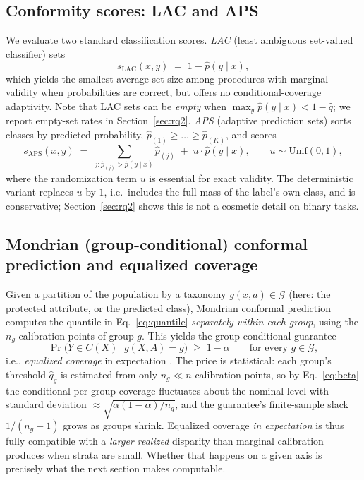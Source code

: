 \documentclass[review,12pt]{elsarticle}
\begin{document}
\subsection{Conformity scores: LAC and APS}
We evaluate two standard classification scores.
\emph{LAC} (least ambiguous set-valued classifier) \cite{sadinle2019} sets
\begin{equation}
s_{\mathrm{LAC}}(x,y) \;=\; 1 - \hat p(y \mid x),
\end{equation}
which yields the smallest average set size among procedures with marginal validity when probabilities are correct, but offers no conditional-coverage adaptivity. Note that LAC sets can be \emph{empty} when $\max_y \hat p(y\mid x) < 1-\hat q$; we report empty-set rates in Section~\ref{sec:rq2}.
\emph{APS} (adaptive prediction sets) \cite{romano2020aps} sorts classes by predicted probability, $\hat p_{(1)} \ge \dots \ge \hat p_{(K)}$, and scores
\begin{equation}
s_{\mathrm{APS}}(x,y) \;=\; \sum_{j : \hat p_{(j)} > \hat p(y\mid x)} \hat p_{(j)} \;+\; u \cdot \hat p(y \mid x),
\qquad u \sim \mathrm{Unif}(0,1),
\label{eq:aps}
\end{equation}
where the randomization term $u$ is essential for exact validity. The deterministic variant replaces $u$ by $1$, i.e.\ includes the full mass of the label's own class, and is conservative; Section~\ref{sec:rq2} shows this is not a cosmetic detail on binary tasks.

\subsection{Mondrian (group-conditional) conformal prediction and equalized coverage}
Given a partition of the population by a taxonomy $g(x,a) \in \mathcal{G}$ (here: the protected attribute, or the predicted class), Mondrian conformal prediction \cite{vovk2003,vovk2012} computes the quantile in Eq.~\eqref{eq:quantile} \emph{separately within each group}, using the $n_g$ calibration points of group $g$. This yields the group-conditional guarantee
\begin{equation}
\Pr\big(Y \in C(X) \,\big|\, g(X,A) = g\big) \;\ge\; 1-\alpha \qquad \text{for every } g \in \mathcal{G},
\label{eq:mondrian}
\end{equation}
i.e., \emph{equalized coverage} in expectation \cite{romano2020eq}. The price is statistical: each group's threshold $\hat q_g$ is estimated from only $n_g \ll n$ calibration points, so by Eq.~\eqref{eq:beta} the conditional per-group coverage fluctuates about the nominal level with standard deviation $\approx \sqrt{\alpha(1-\alpha)/n_g}$, and the guarantee's finite-sample slack $1/(n_g+1)$ grows as groups shrink. Equalized coverage \emph{in expectation} is thus fully compatible with a \emph{larger realized} disparity than marginal calibration produces when strata are small. Whether that happens on a given axis is precisely what the next section makes computable.
\end{document}
